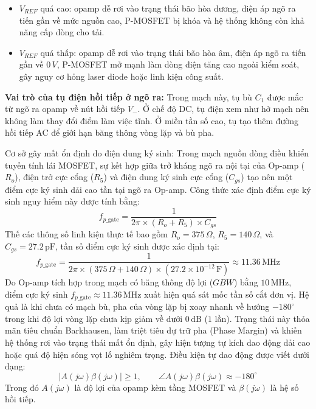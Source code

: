 \begin{itemize}
    \item $V_{REF}$ quá cao: opamp dễ rơi vào trạng thái bão hòa dương, điện áp ngõ ra tiến gần về mức nguồn cao, P-MOSFET bị khóa và hệ thống không còn khả năng cấp dòng cho tải.
    \item $V_{REF}$ quá thấp: opamp dễ rơi vào trạng thái bão hòa âm, điện áp ngõ ra tiến gần về $0\,V$, P-MOSFET mở mạnh làm dòng điện tăng cao ngoài kiểm soát, gây nguy cơ hỏng laser diode hoặc linh kiện công suất.
\end{itemize}

\textbf{Vai trò của tụ điện hồi tiếp ở ngõ ra:} Trong mạch này, tụ bù $C_1$ được mắc từ ngõ ra opamp về nút hồi tiếp $V_-$. Ở chế độ DC, tụ điện xem như hở mạch nên không làm thay đổi điểm làm việc tĩnh. Ở miền tần số cao, tụ tạo thêm đường hồi tiếp AC để giới hạn băng thông vòng lặp và bù pha.

    Cơ sở gây mất ổn định do điện dung ký sinh:
    Trong mạch nguồn dòng điều khiển tuyến tính lái MOSFET, sự kết hợp giữa trở kháng ngõ ra nội tại của Op-amp ($R_o$), điện trở cực cổng ($R_5$) và điện dung ký sinh cực cổng ($C_{gs}$) tạo nên một điểm cực ký sinh dải cao tần tại ngõ ra Op-amp. Công thức xác định điểm cực ký sinh nguy hiểm này được tính bằng:
    \begin{equation*}
    f_{p\_\mathrm{gate}} = \frac{1}{2\pi \times (R_o + R_5) \times C_{gs}}
    \end{equation*}
    Thế các thông số linh kiện thực tế bao gồm $R_o = 375\,\Omega$, $R_5 = 140\,\Omega$, và $C_{gs} = 27.2\,\mathrm{pF}$, tần số điểm cực ký sinh được xác định tại:
    \begin{equation*}
    f_{p\_\mathrm{gate}} = \frac{1}{2\pi \times (375\,\Omega + 140\,\Omega) \times (27.2 \times 10^{-12}\,\mathrm{F})} \approx 11.36\,\mathrm{MHz}
    \end{equation*}
    Do Op-amp tích hợp trong mạch có băng thông độ lợi ($GBW$) bằng $10\,\mathrm{MHz}$, điểm cực ký sinh $f_{p\_\mathrm{gate}} \approx 11.36\,\mathrm{MHz}$ xuất hiện quá sát mốc tần số cắt đơn vị. Hệ quả là khi chưa có mạch bù, pha của vòng lặp bị xoay nhanh về hướng $-180^\circ$ trong khi độ lợi vòng lặp chưa kịp giảm về dưới $0\,\mathrm{dB}$ ($1$ lần). Trạng thái này thỏa mãn tiêu chuẩn Barkhausen, làm triệt tiêu dự trữ pha (Phase Margin) và khiến hệ thống rơi vào trạng thái mất ổn định, gây hiện tượng tự kích dao động dải cao hoặc quá độ hiện sóng vọt lố nghiêm trọng. Điều kiện tự dao động được viết dưới dạng:
    \begin{equation*}
    |A(j\omega)\beta(j\omega)| \geq 1,\qquad \angle A(j\omega)\beta(j\omega) \approx -180^\circ
    \end{equation*}
    Trong đó $A(j\omega)$ là độ lợi của opamp kèm tầng MOSFET và $\beta(j\omega)$ là hệ số hồi tiếp.

